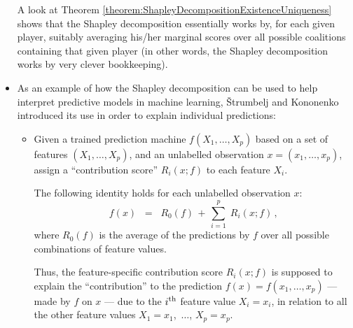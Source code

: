 \begin{itemize}
	A look at Theorem \ref{theorem:ShapleyDecompositionExistenceUniqueness} shows
	that the Shapley decomposition essentially works by,
	for each given player, {\color{red}suitably averaging} his/her {\color{red}marginal scores}
	over all possible coalitions containing that given player
	(in other words, the Shapley decomposition works by very clever bookkeeping).

\item
	As an example of how the Shapley decomposition can be used
	to help interpret predictive models in machine learning,
	\v{S}trumbelj and Kononenko \cite{Strumbelj2010}
	introduced its use in order to {\color{red}explain individual predictions}:
	\begin{itemize}
	\item
		Given a trained prediction machine $f(X_{1},\ldots,X_{p})$
		based on a set of features $(X_{1},\ldots,X_{p})$, and
		an unlabelled observation $x = (x_{1},\ldots,x_{p})$,
		assign a ``contribution score'' $R_{i}(x;f)$ to each feature $X_{i}$.

		The following identity holds for each unlabelled observation $x$:
		\begin{equation*}
		f(x)
		\;\; = \;\;
			R_{0}(f)
			\, + \,
			\overset{p}{\underset{i=1}{\sum}}\;
			R_{i}(x;f)\,,
		\end{equation*}
		where $R_{0}(f)$ is the average of the predictions by $f$
		over all possible combinations of feature values.

		Thus, the feature-specific contribution score $R_{i}(x;f)$ is supposed to
		explain the ``{\color{red}contribution}'' to the prediction
		$f(x) = f(x_{1},\ldots,x_{p})$ --- made by $f$ on $x$ ---
		due to the $i^{\textnormal{th}}$ feature value $X_{i} = x_{i}$,
		in relation to all the other feature values
		$X_{1} = x_{1}$, \,$\ldots$\;, $X_{p} = x_{p}$.


\end{itemize}
\end{itemize}
